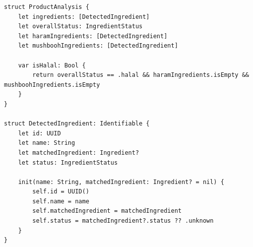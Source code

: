 \begin{lstlisting}[basicstyle=\tiny\ttfamily,breaklines=true]
struct ProductAnalysis {
    let ingredients: [DetectedIngredient]
    let overallStatus: IngredientStatus
    let haramIngredients: [DetectedIngredient]
    let mushboohIngredients: [DetectedIngredient]
    
    var isHalal: Bool {
        return overallStatus == .halal && haramIngredients.isEmpty && mushboohIngredients.isEmpty
    }
}

struct DetectedIngredient: Identifiable {
    let id: UUID
    let name: String
    let matchedIngredient: Ingredient?
    let status: IngredientStatus
    
    init(name: String, matchedIngredient: Ingredient? = nil) {
        self.id = UUID()
        self.name = name
        self.matchedIngredient = matchedIngredient
        self.status = matchedIngredient?.status ?? .unknown
    }
}
\end{lstlisting}

